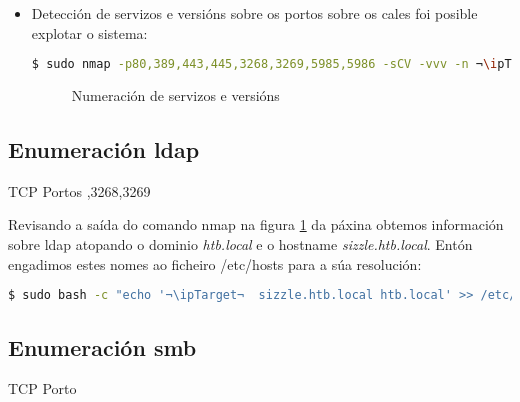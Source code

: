 \documentclass[a4paper]{article}
\newcommand{\nmapTargeted}{nmap_sizzle_targeted.png}
\newcommand{\ipTarget}{10.10.10.103}
\begin{document}
\begin{itemize}
        \clearpage
        \item Detección de servizos e versións sobre os portos sobre os cales foi posible explotar o sistema:

        \begin{lstlisting}[language=Bash, caption=nmap scripting sobre servizos e versións]
$ sudo nmap -p80,389,443,445,3268,3269,5985,5986 -sCV -vvv -n ¬\ipTarget¬
        \end{lstlisting}
         \begin{figure}[h]
                \begin{center}
                \caption{Numeración de servizos e versións}
                \label{fig:servicesResults}
                \end{center}
        \end{figure}

        \end{itemize}

        \subsection{Enumeración ldap}
        \vspace{0.2cm}

        \begin{schema}{TCP}
        Portos
        ,3268,3269
        \end{schema}
Revisando a saída do comando nmap na figura \ref{fig:servicesResults} da páxina \pageref{fig:servicesResults} obtemos información sobre ldap atopando o dominio \textit{htb.local} e o hostname \textit{sizzle.htb.local}. Entón engadimos estes nomes ao ficheiro /etc/hosts para a súa resolución:
        \begin{lstlisting}[language=Bash, caption=Resolución DNS: /etc/hosts]
$ sudo bash -c "echo '¬\ipTarget¬  sizzle.htb.local htb.local' >> /etc/hosts"\end{lstlisting}


        \clearpage
        \subsection{Enumeración smb}
        \vspace{0.2cm}

        \begin{schema}{TCP}
        Porto
        \end{schema}
 
\end{document}

